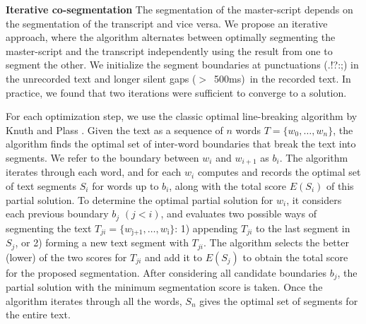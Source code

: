 \textbf{Iterative co-segmentation}
The segmentation of the master-script depends on the segmentation of the transcript and vice versa. We propose an iterative approach, where the algorithm alternates between optimally segmenting the master-script and the transcript independently using the result from one to segment the other. We initialize the segment boundaries at punctuations (.!?:;) in the unrecorded text and longer silent gaps ($>$\ 500ms)\ in the recorded text. In practice, we
found that two iterations were sufficient to converge to a solution.


For each optimization step, we use the classic optimal line-breaking algorithm by Knuth and Plass \cite{}. Given the text as a sequence of $n$ words $T = \{w_0,\dots,w_n\}$, the algorithm finds the optimal set of inter-word
boundaries that break the text into segments. We refer to the boundary between $w_i$ and $w_{i+1}$ as
$b_i$.
%
The algorithm iterates through each word, and for each $w_i$
computes and records the optimal set of text segments $S_i$ for words up to $b_i$, along with the total score $E(S_i)$ of
this partial solution. To determine the optimal partial solution for $w_i$, it
considers each previous boundary $b_j$ $(j<i)$, and evaluates two possible ways of
segmenting the text $T_{ji} = \{w_\text{j+1},
\dots,w_\text{i}\}$: 1) appending $T_{ji}$ to the last segment in $S_j$, or 2) forming a new text segment with $T_{ji}$. The algorithm selects the better (lower) of the two scores for $T_{ji}$ and add it
to $E(S_j)$ to obtain the total score for the proposed
segmentation. After considering all candidate boundaries $b_j$, the partial solution with the minimum segmentation score is taken. Once the algorithm iterates through all the words, $S_n$ gives the
optimal set of segments for the entire text. 

